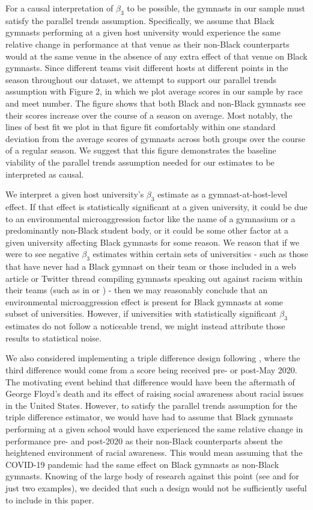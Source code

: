 \documentclass[12pt]{article}
\begin{document}
For a causal interpretation of $\beta_3$ to be possible, the gymnasts in our sample must satisfy the parallel trends assumption. Specifically, we assume that Black gymnasts performing at a given host university would experience the same relative change in performance at that venue as their non-Black counterparts would at the same venue in the absence of any extra effect of that venue on Black gymnasts. Since different teams visit different hosts at different points in the season throughout our dataset, we attempt to support our parallel trends assumption with Figure 2, in which we plot average scores in our sample by race and meet number. The figure shows that both Black and non-Black gymnasts see their scores increase over the course of a season on average. Most notably, the lines of best fit we plot in that figure fit comfortably within one standard deviation from the average scores of gymnasts across both groups over the course of a regular season. We suggest that this figure demonstrates the baseline viability of the parallel trends assumption needed for our estimates to be interpreted as causal.

We interpret a given host university's $\beta_3$ estimate as a gymnast-at-host-level effect. If that effect is statistically significant at a given university, it could be due to an environmental microaggression factor like the name of a gymnasium or a predominantly non-Black student body, or it could be some other factor at a given university affecting Black gymnasts for some reason. We reason that if we were to see negative $\beta_3$ estimates within certain sets of universities - such as those that have never had a Black gymnast on their team or those included in a web article or Twitter thread compiling gymnasts speaking out against racism within their teams (such as in \cite{duffy_2020} or \cite{boswell_2020}) - then we may reasonably conclude that an environmental microaggression effect is present for Black gymnasts at some subset of universities. However, if universities with statistically significant $\beta_3$ estimates do not follow a noticeable trend, we might instead attribute those results to statistical noise.

We also considered implementing a triple difference design following \cite{olden_moen_2022}, where the third difference would come from a score being received pre- or post-May 2020. The motivating event behind that difference would have been the aftermath of George Floyd's death and its effect of raising social awareness about racial issues in the United States. However, to satisfy the parallel trends assumption for the triple difference estimator, we would have had to assume that Black gymnasts performing at a given school would have experienced the same relative change in performance pre- and post-2020 as their non-Black counterparts absent the heightened environment of racial awareness. This would mean assuming that the COVID-19 pandemic had the same effect on Black gymnasts as non-Black gymnasts. Knowing of the large body of research against this point (see \cite{covid_2021} and \cite{covid_2020} for just two examples), we decided that such a design would not be sufficiently useful to include in this paper.
\end{document}
